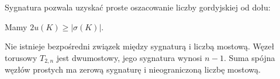 Sygnatura pozwala uzyskać proste oszacowanie liczby gordyjskiej od dołu:

\begin{proposition}
    Mamy $2 u(K) \ge |\sigma(K)|$.
\end{proposition}

Nie istnieje bezpośredni związek między sygnaturą i liczbą mostową.
Węzeł torusowy $T_{2,n}$ jest dwumostowy, jego sygnatura wynosi $n - 1$.
Suma spójna węzłów prostych ma zerową sygnaturę i nieograniczoną liczbę mostową.



